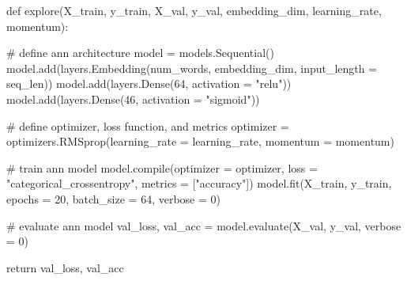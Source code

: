 \documentclass[
  letterpaper,
  DIV=11,
  numbers=noendperiod]{scrreprt}
\newenvironment{Shaded}{\begin{snugshade}}{\end{snugshade}}
\newcommand{\BuiltInTok}[1]{\textcolor[rgb]{0.00,0.23,0.31}{#1}}
\newcommand{\CommentTok}[1]{\textcolor[rgb]{0.37,0.37,0.37}{#1}}
\newcommand{\ControlFlowTok}[1]{\textcolor[rgb]{0.00,0.23,0.31}{#1}}
\newcommand{\DecValTok}[1]{\textcolor[rgb]{0.68,0.00,0.00}{#1}}
\newcommand{\KeywordTok}[1]{\textcolor[rgb]{0.00,0.23,0.31}{#1}}
\newcommand{\NormalTok}[1]{\textcolor[rgb]{0.00,0.23,0.31}{#1}}
\newcommand{\OperatorTok}[1]{\textcolor[rgb]{0.37,0.37,0.37}{#1}}
\newcommand{\StringTok}[1]{\textcolor[rgb]{0.13,0.47,0.30}{#1}}
\begin{document}
\begin{Shaded}
\begin{Highlighting}[]
\KeywordTok{def}\NormalTok{ explore(X\_train, }
\NormalTok{            y\_train,}
\NormalTok{            X\_val,}
\NormalTok{            y\_val,}
\NormalTok{            embedding\_dim,}
\NormalTok{            learning\_rate,}
\NormalTok{            momentum):}
    
    \CommentTok{\# define ann architecture}
\NormalTok{    model }\OperatorTok{=}\NormalTok{ models.Sequential()}
\NormalTok{    model.add(layers.Embedding(num\_words, embedding\_dim, input\_length }\OperatorTok{=}\NormalTok{ seq\_len))}
\NormalTok{    model.add(layers.Dense(}\DecValTok{64}\NormalTok{, activation }\OperatorTok{=} \StringTok{"relu"}\NormalTok{))}
\NormalTok{    model.add(layers.Dense(}\DecValTok{46}\NormalTok{, activation }\OperatorTok{=} \StringTok{"sigmoid"}\NormalTok{))}

    \CommentTok{\# define optimizer, loss function, and metrics}
\NormalTok{    optimizer }\OperatorTok{=}\NormalTok{ optimizers.RMSprop(learning\_rate }\OperatorTok{=}\NormalTok{ learning\_rate, momentum }\OperatorTok{=}\NormalTok{ momentum)}

    \CommentTok{\# train ann model}
\NormalTok{    model.}\BuiltInTok{compile}\NormalTok{(optimizer }\OperatorTok{=}\NormalTok{ optimizer, loss }\OperatorTok{=} \StringTok{"categorical\_crossentropy"}\NormalTok{, metrics }\OperatorTok{=}\NormalTok{ [}\StringTok{"accuracy"}\NormalTok{])}
\NormalTok{    model.fit(X\_train, y\_train, epochs }\OperatorTok{=} \DecValTok{20}\NormalTok{, batch\_size }\OperatorTok{=} \DecValTok{64}\NormalTok{, verbose }\OperatorTok{=} \DecValTok{0}\NormalTok{)}

    \CommentTok{\# evaluate ann model}
\NormalTok{    val\_loss, val\_acc }\OperatorTok{=}\NormalTok{ model.evaluate(X\_val, y\_val, verbose }\OperatorTok{=} \DecValTok{0}\NormalTok{)}

    \ControlFlowTok{return}\NormalTok{ val\_loss, val\_acc}
\end{Highlighting}
\end{Shaded}
\end{document}
